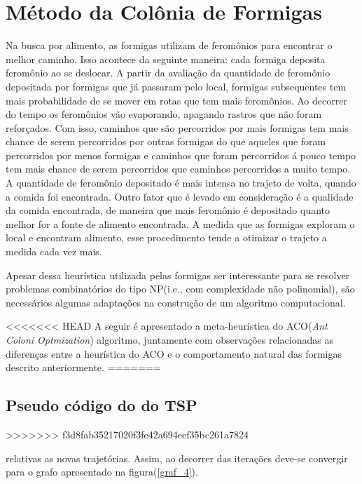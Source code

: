 \section{Método da Colônia de Formigas}

Na busca por alimento, as formigas utilizam de feromônios para encontrar o melhor caminho.
Isso acontece da seguinte maneira: cada formiga deposita feromônio ao se deslocar. A partir
da avaliação da quantidade de feromônio depositada por formigas que já passaram pelo local,
formigas subsequentes tem mais probabilidade de se mover em rotas que tem mais feromônios. Ao
decorrer do tempo os feromônios vão evaporando, apagando rastros que não foram reforçados. 
Com isso, caminhos que são percorridos por mais formigas tem mais chance de serem 
percorridos por outras formigas do que aqueles que foram percorridos por menos formigas e 
caminhos que foram percorridos á pouco tempo tem mais chance de serem percorridos que caminhos
percorridos a muito tempo. A quantidade de feromônio depositado é mais intensa no trajeto de volta,
quando a comida foi encontrada. Outro fator que é levado em consideração é a qualidade da comida
encontrada, de maneira que mais feromônio é depositado quanto melhor for a fonte de alimento encontrada.
A medida que as formigas exploram o local e encontram alimento, esse procedimento tende a otimizar o
trajeto a medida cada vez mais.

Apesar dessa heurística utilizada pelas formigas ser interessante para se resolver problemas combinatórios 
do tipo NP(i.e., com complexidade não polinomial), são necessários algumas adaptações na construção
de um algoritmo computacional. 

<<<<<<< HEAD
A seguir é apresentado a meta-heurística do ACO(\textit{Ant Coloni Optmization}) algoritmo, juntamente com observações relacionadas as diferenças
entre a heurística do ACO e o comportamento natural das formigas descrito anteriormente.
=======
\subsection{Pseudo código do  do TSP}
>>>>>>> f3d8fab35217020f3fe42a694eef35bc261a7824


relativas as novas trajetórias. Assim, ao decorrer das iterações deve-se convergir para o grafo apresentado na figura(\ref{graf_4}).
